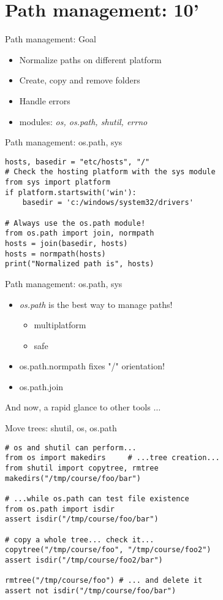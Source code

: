 \section{Path management: 10'}

\begin{frame}[fragile]{Path management: Goal}
\begin{itemize}
\item Normalize paths on different platform
\item Create, copy and remove folders
\item Handle errors
\item modules: \emph{os, os.path, shutil, errno}
\end{itemize}
\end{frame}

\begin{frame}[fragile]{Path management: os.path, sys}
\begin{verbatim}
hosts, basedir = "etc/hosts", "/"
# Check the hosting platform with the sys module
from sys import platform
if platform.startswith('win'):
    basedir = 'c:/windows/system32/drivers'

# Always use the os.path module!
from os.path import join, normpath 
hosts = join(basedir, hosts)
hosts = normpath(hosts)
print("Normalized path is", hosts)
\end{verbatim}
\end{frame}

\begin{frame}[fragile]{Path management: os.path, sys}
\Large
\begin{itemize}
\item \emph{os.path} is the best way to manage paths!
\begin{itemize}
 \Large
 \item multiplatform
 \item safe
 \end{itemize}
 
\item os.path.normpath fixes "/" orientation!
\item os.path.join 
 \end{itemize}
And now, a rapid glance to other tools $\ldots$
\end{frame}

\begin{frame}[fragile]{Move trees: shutil, os, os.path}
\begin{verbatim}
# os and shutil can perform...
from os import makedirs     # ...tree creation...
from shutil import copytree, rmtree 
makedirs("/tmp/course/foo/bar")

# ...while os.path can test file existence
from os.path import isdir            
assert isdir("/tmp/course/foo/bar")

# copy a whole tree... check it...
copytree("/tmp/course/foo", "/tmp/course/foo2") 
assert isdir("/tmp/course/foo2/bar")            

rmtree("/tmp/course/foo") # ... and delete it
assert not isdir("/tmp/course/foo/bar")
\end{verbatim}
\end{frame}

